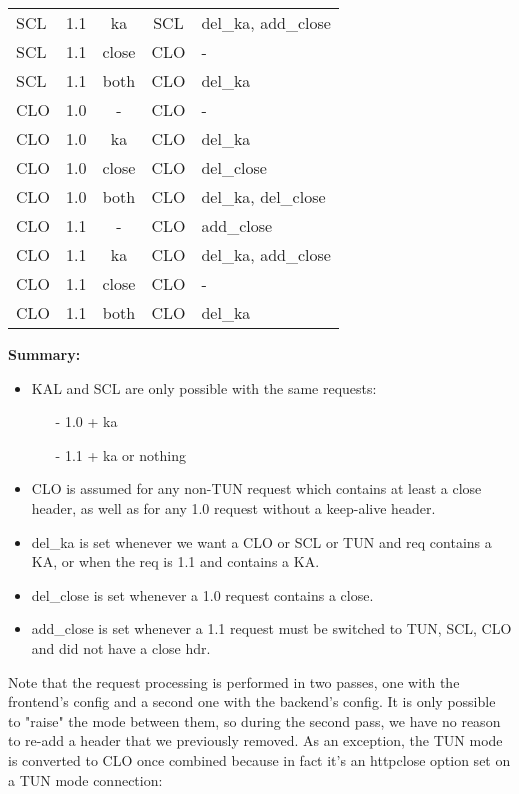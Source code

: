 \begin{longtable}{lcccl}
SCL  & 1.1  &     ka      & SCL   &   del\_ka, add\_close \\
SCL  & 1.1  &    close    & CLO   &    - \\
SCL  & 1.1  &    both     & CLO   &   del\_ka \\
\hline
CLO  & 1.0  &      -      & CLO   &    - \\
CLO  & 1.0  &     ka      & CLO   &   del\_ka \\
CLO  & 1.0  &    close    & CLO   &   del\_close \\
CLO  & 1.0  &    both     & CLO   &   del\_ka, del\_close \\
\hline
CLO  & 1.1  &      -      & CLO   &   add\_close \\
CLO  & 1.1  &     ka      & CLO   &   del\_ka, add\_close \\
CLO  & 1.1  &    close    & CLO   &    - \\
CLO  & 1.1  &    both     & CLO   &   del\_ka \\
\end{longtable}
\vspace{3mm}

\textbf{Summary:}
\begin{itemize}
\item KAL and SCL are only possible with the same requests:
     \begin{itemize}
     \item[-] 1.0 + ka
     \item[-] 1.1 + ka or nothing
     \end{itemize}

\item CLO is assumed for any non-TUN request which contains at least a close
     header, as well as for any 1.0 request without a keep-alive header.

\item del\_ka is set whenever we want a CLO or SCL or TUN and req contains a KA,
     or when the req is 1.1 and contains a KA.

\item del\_close is set whenever a 1.0 request contains a close.

\item add\_close is set whenever a 1.1 request must be switched to TUN, SCL, CLO
     and did not have a close hdr.
\end{itemize}

Note that the request processing is performed in two passes, one with the
frontend's config and a second one with the backend's config. It is only
possible to "raise" the mode between them, so during the second pass, we have
no reason to re-add a header that we previously removed. As an exception, the
TUN mode is converted to CLO once combined because in fact it's an httpclose
option set on a TUN mode connection:

